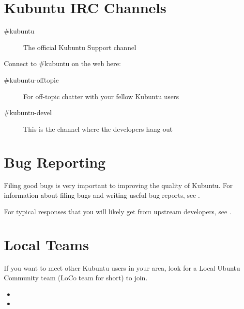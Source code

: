 \documentclass[letterpaper,10pt,english]{sphinxmanual}
\begin{document}
\section{Kubuntu IRC Channels}
\label{\detokenize{docs/contribute:kubuntu-irc-channels}}\begin{description}
\item[{\#kubuntu}] \leavevmode
The official Kubuntu Support channel

\end{description}

Connect to \#kubuntu on the web here: 
\begin{description}
\item[{\#kubuntu-offtopic}] \leavevmode
For off-topic chatter with your fellow Kubuntu users

\item[{\#kubuntu-devel}] \leavevmode
This is the channel where the developers hang out

\end{description}


\section{Bug Reporting}
\label{\detokenize{docs/contribute:bug-reporting}}
Filing good bugs is very important to improving the quality of Kubuntu. For information about filing bugs and writing useful bug reports, see .

For typical responses that you will likely get from upstream  developers, see .


\section{Local Teams}
\label{\detokenize{docs/contribute:local-teams}}
If you want to meet other Kubuntu users in your area, look for a Local Ubuntu Community team (LoCo team for short) to join.
\begin{itemize}
\item {} 

\item {} 

\end{itemize}
\end{document}
